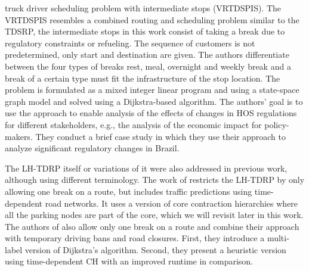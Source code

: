 truck driver scheduling problem with intermediate stops (VRTDSPIS). The VRTDSPIS resembles a combined routing and scheduling problem similar to the TDSRP, the intermediate stops in this work consist of taking a break due to regulatory constraints or refueling. The sequence of customers is not predetermined, only start and destination are given. The authors differentiate between the four types of breaks rest, meal, overnight and weekly break and a break of a certain type must fit the infrastructure of the stop location. The problem is formulated as a mixed integer linear program and using a state-space graph model and solved using a Dijkstra-based algorithm. The authors' goal is to use the approach to enable analysis of the effects of changes in HOS regulations for different stakeholders, e.g., the analysis of the economic impact for policy-makers. They conduct a brief case study in which they use their approach to analyze significant regulatory changes in Brazil.

The LH-TDRP itself or variations of it were also addressed in previous work, although using different terminology. The work of \cite{kleff:2017} restricts the LH-TDRP by only allowing one break on a route, but includes traffic predictions using time-dependent road networks. It uses a version of core contraction hierarchies where all the parking nodes are part of the core, which we will revisit later in this work. The authors of \cite{tuin:2018} also allow only one break on a route and combine their approach with temporary driving bans and road closures. First, they introduce a multi-label version of Dijkstra's algorithm. Second, they present a heuristic version using time-dependent CH with an improved runtime in comparison.

